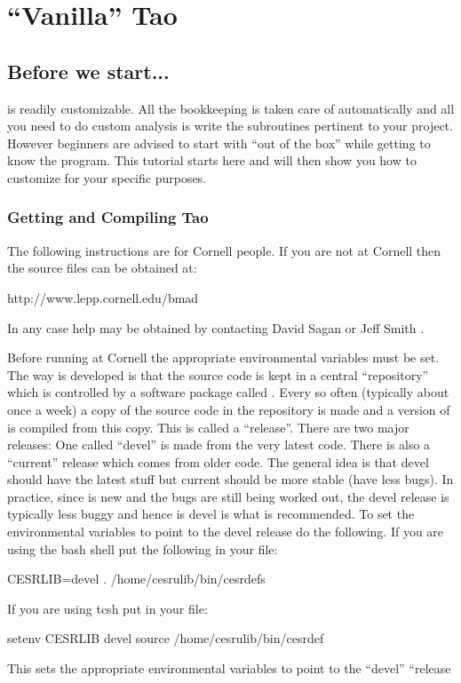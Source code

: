 

\chapter{``Vanilla'' Tao}
\label{c:vanilla_tao}

\section{Before we start...}
\label{s:before_beginning}

\tao is readily customizable. All the bookkeeping is taken care of
automatically and all you need to do custom analysis is write the
subroutines pertinent to your project. However beginners are advised
to start with ``out of the box'' \tao while getting to know the
program. This tutorial starts here and will then show you how to
customize \tao for your specific purposes.

\subsection{Getting and Compiling Tao}
\label{s:get_and_compile}

The following instructions are for Cornell people. If you are not at
Cornell then the source files can be obtained at:
\begin{example}
  http://www.lepp.cornell.edu/bmad
\end{example}

In any case help may be obtained by contacting David Sagan
 or Jeff Smith .

Before running \tao at Cornell the appropriate environmental variables
must be set. The way \tao is developed is that the source code is kept
in a central ``repository'' which is controlled by a software package
called . Every so often (typically about once a week) a copy
of the source code in the repository is made and a version of \tao is
compiled from this copy. This is called a ``release''. There are two
major releases: One called ``devel'' is made from the very latest
code. There is also a ``current'' release which comes from older
code. The general idea is that devel should have the latest stuff but
current should be more stable (have less bugs). In practice, since
\tao is new and the bugs are still being worked out, the devel release
is typically less buggy and hence is devel is what is recommended. To
set the environmental variables to point to the devel release do the
following.  If you are using the bash shell put the following in your
 file:
\begin{example}
  CESRLIB=devel
  . /home/cesrulib/bin/cesrdefs
\end{example}
If you are using tcsh put in your  file: 
\begin{example} 
  setenv CESRLIB devel
  source /home/cesrulib/bin/cesrdef
\end{example}
This sets the appropriate environmental variables to point to the
``devel'' ``release

